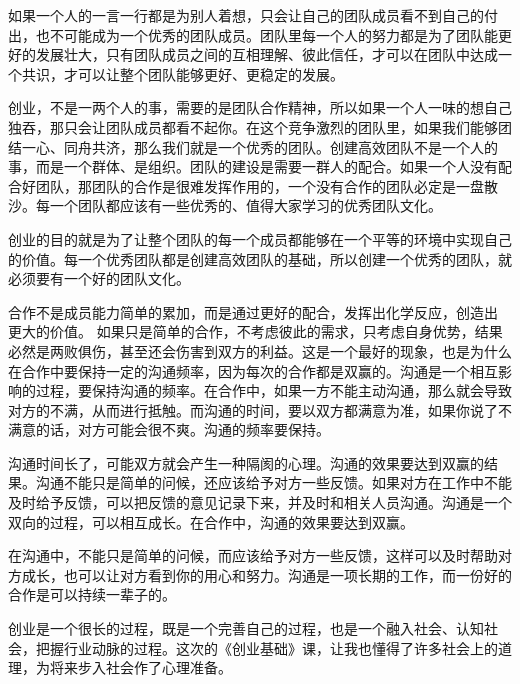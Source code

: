 \documentclass[UTF8]{article}
\begin{document}
如果一个人的一言一行都是为别人着想，只会让自己的团队成员看不到自己的付出，也不可能成为一个优秀的团队成员。团队里每一个人的努力都是为了团队能更好的发展壮大，只有团队成员之间的互相理解、彼此信任，才可以在团队中达成一个共识，才可以让整个团队能够更好、更稳定的发展。

创业，不是一两个人的事，需要的是团队合作精神，所以如果一个人一味的想自己独吞，那只会让团队成员都看不起你。在这个竞争激烈的团队里，如果我们能够团结一心、同舟共济，那么我们就是一个优秀的团队。创建高效团队不是一个人的事，而是一个群体、是组织。团队的建设是需要一群人的配合。如果一个人没有配合好团队，那团队的合作是很难发挥作用的，一个没有合作的团队必定是一盘散沙。每一个团队都应该有一些优秀的、值得大家学习的优秀团队文化。

创业的目的就是为了让整个团队的每一个成员都能够在一个平等的环境中实现自己的价值。每一个优秀团队都是创建高效团队的基础，所以创建一个优秀的团队，就必须要有一个好的团队文化。

合作不是成员能力简单的累加，而是通过更好的配合，发挥出化学反应，创造出
更大的价值。  如果只是简单的合作，不考虑彼此的需求，只考虑自身优势，结果必然是两败俱伤，甚至还会伤害到双方的利益。这是一个最好的现象，也是为什么在合作中要保持一定的沟通频率，因为每次的合作都是双赢的。沟通是一个相互影响的过程，要保持沟通的频率。在合作中，如果一方不能主动沟通，那么就会导致对方的不满，从而进行抵触。而沟通的时间，要以双方都满意为准，如果你说了不满意的话，对方可能会很不爽。沟通的频率要保持。

沟通时间长了，可能双方就会产生一种隔阂的心理。沟通的效果要达到双赢的结果。沟通不能只是简单的问候，还应该给予对方一些反馈。如果对方在工作中不能及时给予反馈，可以把反馈的意见记录下来，并及时和相关人员沟通。沟通是一个双向的过程，可以相互成长。在合作中，沟通的效果要达到双赢。

在沟通中，不能只是简单的问候，而应该给予对方一些反馈，这样可以及时帮助对方成长，也可以让对方看到你的用心和努力。沟通是一项长期的工作，而一份好的合作是可以持续一辈子的。

创业是一个很长的过程，既是一个完善自己的过程，也是一个融入社会、认知社会，把握行业动脉的过程。这次的《创业基础》课，让我也懂得了许多社会上的道理，为将来步入社会作了心理准备。
\end{document}
